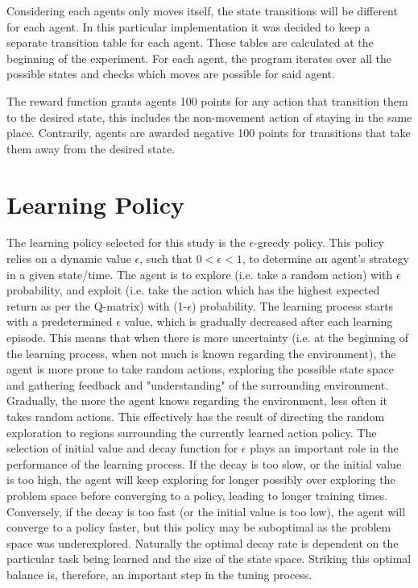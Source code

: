 \documentclass[10pt]{article}
\begin{document}
    Considering each agents only moves itself, the state transitions will be different for each agent. In this particular implementation it was decided to keep a separate transition table for each agent. These tables are calculated at the beginning of the experiment. For each agent, the program iterates over all the possible states and checks which moves are possible for said agent.

    The reward function grants agents 100 points for any action that transition them to the desired state, this includes the non-movement action of staying in the same place. Contrarily, agents are awarded negative 100 points for transitions that take them away from the desired state.

\section{Learning Policy} \label{sec:learning_policy}
    The learning policy selected for this study is the $\epsilon$-greedy policy. This policy relies on a dynamic value $\epsilon$, such that $0<\epsilon<1$, to determine an agent's strategy in a given state/time. The agent is to explore (i.e. take a random action) with $\epsilon$ probability, and exploit (i.e. take the action which has the highest expected return as per the Q-matrix) with (1-$\epsilon$) probability. The learning process starts with a predetermined $\epsilon$ value, which is gradually decreased after each learning episode. This means that when there is more uncertainty (i.e. at the beginning of the learning process, when not much is known regarding the environment), the agent is more prone to take random actions, exploring the possible state space and gathering feedback and "understanding" of the surrounding environment. Gradually, the more the agent knows regarding the environment, less often it takes random actions. This effectively has the result of directing the random exploration to regions surrounding the currently learned action policy. The selection of initial value and decay function for $\epsilon$ plays an important role in the performance of the learning process. If the decay is too slow, or the initial value is too high, the agent will keep exploring for longer possibly over exploring the problem space before converging to a policy, leading to longer training times. Conversely, if the decay is too fast (or the initial value is too low), the agent will converge to a policy faster, but this policy may be suboptimal as the problem space was underexplored. Naturally the optimal decay rate is dependent on the particular task being learned and the size of the state space. Striking this optimal balance is, therefore, an important step in the tuning process.
\end{document}
